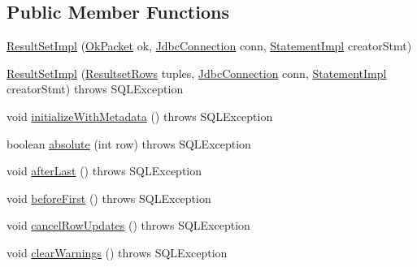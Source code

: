 \subsection*{Public Member Functions}
\begin{DoxyCompactItemize}
\item 
\mbox{\hyperlink{classcom_1_1mysql_1_1cj_1_1jdbc_1_1result_1_1_result_set_impl_a914a5dc6a7f92d9cb726895992aaeb0e}{Result\+Set\+Impl}} (\mbox{\hyperlink{classcom_1_1mysql_1_1cj_1_1protocol_1_1a_1_1result_1_1_ok_packet}{Ok\+Packet}} ok, \mbox{\hyperlink{interfacecom_1_1mysql_1_1cj_1_1jdbc_1_1_jdbc_connection}{Jdbc\+Connection}} conn, \mbox{\hyperlink{classcom_1_1mysql_1_1cj_1_1jdbc_1_1_statement_impl}{Statement\+Impl}} creator\+Stmt)
\item 
\mbox{\hyperlink{classcom_1_1mysql_1_1cj_1_1jdbc_1_1result_1_1_result_set_impl_a2ebfe75dbf98c582aa529c0c65aa4ccb}{Result\+Set\+Impl}} (\mbox{\hyperlink{interfacecom_1_1mysql_1_1cj_1_1protocol_1_1_resultset_rows}{Resultset\+Rows}} tuples, \mbox{\hyperlink{interfacecom_1_1mysql_1_1cj_1_1jdbc_1_1_jdbc_connection}{Jdbc\+Connection}} conn, \mbox{\hyperlink{classcom_1_1mysql_1_1cj_1_1jdbc_1_1_statement_impl}{Statement\+Impl}} creator\+Stmt)  throws S\+Q\+L\+Exception 
\item 
void \mbox{\hyperlink{classcom_1_1mysql_1_1cj_1_1jdbc_1_1result_1_1_result_set_impl_a83a383615c0e63986857084dd29750b0}{initialize\+With\+Metadata}} ()  throws S\+Q\+L\+Exception 
\item 
boolean \mbox{\hyperlink{classcom_1_1mysql_1_1cj_1_1jdbc_1_1result_1_1_result_set_impl_acf33f2f745961fc69369edcfd4a80db2}{absolute}} (int row)  throws S\+Q\+L\+Exception 
\item 
void \mbox{\hyperlink{classcom_1_1mysql_1_1cj_1_1jdbc_1_1result_1_1_result_set_impl_ae9eb2ace7cbdf8884d9efec6e7d85bc1}{after\+Last}} ()  throws S\+Q\+L\+Exception 
\item 
void \mbox{\hyperlink{classcom_1_1mysql_1_1cj_1_1jdbc_1_1result_1_1_result_set_impl_a5d96f0944fa2ba630ab798a7ea305931}{before\+First}} ()  throws S\+Q\+L\+Exception 
\item 
void \mbox{\hyperlink{classcom_1_1mysql_1_1cj_1_1jdbc_1_1result_1_1_result_set_impl_ae2ee4c2f214910978450ea90cd2ca3a8}{cancel\+Row\+Updates}} ()  throws S\+Q\+L\+Exception 
\item 
void \mbox{\hyperlink{classcom_1_1mysql_1_1cj_1_1jdbc_1_1result_1_1_result_set_impl_aa785bccb5adae1c8f447ccd47cd92ec6}{clear\+Warnings}} ()  throws S\+Q\+L\+Exception 
\item 

\end{DoxyCompactItemize}
